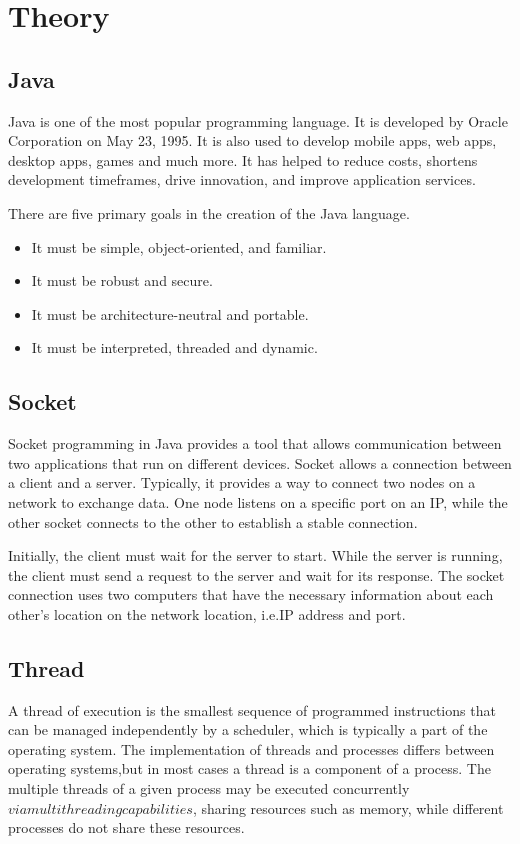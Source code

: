 \chapter{Theory}\label{ch:theory}


\section{Java}\label{sec:java}
Java is one of the most popular programming language.
It is developed by Oracle Corporation on May 23, 1995.
It is also used to develop mobile apps, web apps, desktop apps, games and much more.
It has helped to reduce costs, shortens development timeframes, drive innovation,
and improve application services. \citep{School2022}
\medskip

\noindent
There are five primary goals in the creation of the Java language.
\begin{itemize}
    \item It must be simple, object-oriented, and familiar.
    \item It must be robust and secure.
    \item It must be architecture-neutral and portable.
    \item It must be interpreted, threaded and dynamic.
\end{itemize}


\section{Socket}\label{sec:socket}
Socket programming in Java provides a tool that allows communication between two applications
that run on different devices.
Socket allows a connection between a client and a server.
Typically, it provides a way to connect two nodes on a network to exchange data.
One node listens on a specific port on an IP, while the other socket connects to the other to
establish a stable connection.
\medskip

\noindent
Initially, the client must wait for the server to start.
While the server is running, the client must send a request to the server and wait for its
response.
The socket connection uses two computers that have the necessary information about each
other's location on the network location, i.e.IP address and port.


\section{Thread}\label{sec:thread}
A thread of execution is the smallest sequence of programmed instructions that can be managed
independently by a scheduler, which is typically a part of the operating system.
The implementation of threads and processes differs between operating systems,but in most cases
a thread is a component of a process.
The multiple threads of a given process may be executed concurrently
\(via multithreading capabilities\), sharing resources such as memory, while different
processes do not share these resources. \citep{thread:2022}
\medskip


